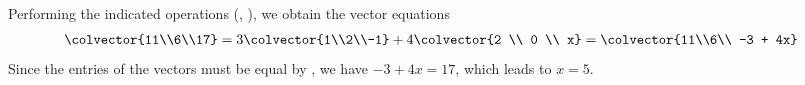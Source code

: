 Performing the indicated operations (, ), we obtain the vector equations
\begin{align*}
\colvector{11\\6\\17} 
&= 3\colvector{1\\2\\-1} + 4\colvector{2 \\ 0 \\ x} 
= \colvector{11\\6\\ -3 + 4x}
\end{align*}
Since the entries of the vectors must be equal by , we have $-3 + 4x = 17$, which leads to $x = 5$.